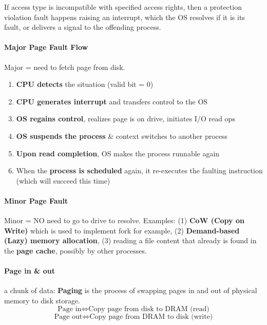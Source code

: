 \documentclass[openany,12pt]{book}
\begin{document}
If access type is incompatible with specified access rights, then a protection violation fault happens raising an interrupt, which the OS resolves if it is its fault, or delivers a signal to the offending process.


\paragraph{Major Page Fault Flow} Major = need to fetch page from disk.
\begin{enumerate}
  \item \textbf{CPU detects} the situation (valid bit = 0)
  \item \textbf{CPU generates interrupt} and transfers control to the OS
  \item \textbf{OS regains control}, realizes page is on drive, initiates I/O read ops
  \item \textbf{OS suspends the process} \& context switches to another process
  \item \textbf{Upon read completion}, OS makes the process runnable again
  \item When the \textbf{process is scheduled} again, it re-executes the faulting instruction (which will succeed this time)
\end{enumerate}


\paragraph{Minor Page Fault} Minor = NO need to go to drive to resolve.
Examples: (1) \textbf{CoW (Copy on Write)} which is used to implement fork for example, (2) \textbf{Demand-based (Lazy) memory allocation}, (3) reading a file content that already is found in the \textbf{page cache}, possibly by other processes.

\paragraph{Page in \& out} a chunk of data: \textbf{Paging} is the process of swapping pages in and out of physical memory to disk storage.
$$
\text{Page in} \Longleftrightarrow \text{Copy page from disk to DRAM (read)}
$$
$$
\text{Page out} \Longleftrightarrow \text{Copy page from DRAM to disk (write)}
$$
\end{document}
